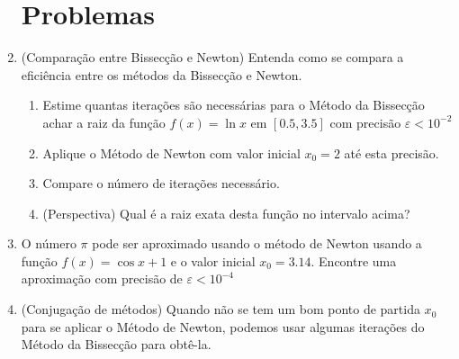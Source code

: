\documentclass[a4paper]{article}
\begin{document}
\begin{enumerate}
\section{Problemas}

\item (Comparação entre Bissecção e Newton) Entenda como se compara a
  eficiência entre os métodos da Bissecção e Newton.

  \begin{enumerate}
  \item Estime quantas iterações são necessárias para o Método da
    Bissecção achar a raiz da função $f(x)=\ln x$ em $[0.5, 3.5]$ com
    precisão $\varepsilon < 10^{-2}$
  \item Aplique o Método de Newton com valor inicial $x_0 = 2$ até esta
    precisão.
  \item Compare o número de iterações necessário.
  \item (Perspectiva) Qual é a raiz exata desta função no intervalo
    acima?
  \end{enumerate}
 

\item O número $\pi$ pode ser aproximado usando o método de Newton
  usando a função $f(x) = \cos x +1$ e o valor inicial $x_0 =
  3.14$. Encontre uma aproximação com precisão de $\varepsilon <
  10^{-4}$

\item (Conjugação de métodos) Quando não se tem um bom ponto de
  partida $x_0$ para se aplicar o Método de Newton, podemos usar
  algumas iterações do Método da Bissecção para obtê-la.

\end{enumerate}
\end{document}

